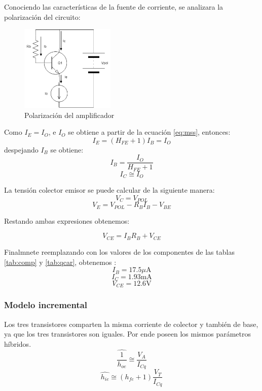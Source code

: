 \documentclass[../../main.tex]{subfiles}
\begin{document}
Conociendo las características de la fuente de corriente, se analizara la polarización del circuito:

\begin{figure}[H]	
	\centering
	\includegraphics[width=0.4\textwidth]{imagenes/pol.png}
	\caption{Polarizaci\'on del amplificador}
\end{figure}

Como $I_E=I_O $, e $ I_O $ se obtiene a partir de la ecuación \ref{eq:mss}, entonces:
\begin{equation}
I_E=\left( H_{FE} +1 \right)  I_B=I_O
\end{equation}
despejando $I_B$ se obtiene:
\begin{equation}
I_B=\frac{I_O}{H_{FE}+1}
\end{equation}
\begin{equation}
I_{C}\cong I_O
\end{equation}

La tensión colector emisor se puede calcular de la siguiente manera:
\begin{equation}
V_C=V_{POL}
\end{equation}
\begin{equation}
V_E=V_{POL} - R_B I_B - V_{BE}
\end{equation}

Restando ambas expresiones obtenemos:

\begin{equation}
V_{CE}=I_B R_B + V_{CE}
\end{equation}

Finalmnete reemplazando con los valores de los componentes de las tablas \ref{tab:comp} y \ref{tab:qcar}, obtenemos :
$$I_B=17.5\mu \mathrm{A} $$
$$I_C=1.93 \mathrm{mA} $$
$$V_{CE}=12.6\mathrm{V} $$

\subsubsection{Modelo incremental}
Los tres transistores comparten la misma corriente de colector y también de base, ya que los tres transistores son iguales. Por ende poseen los  mismos parámetros híbridos.
$$\widehat{\frac{1}{h_{oe}}}\cong \frac{V_A}{I_{Cq}} $$
$$ \widehat{h_{ie}}\cong (h_{fe}+1)\frac{V_T}{I_{Cq}}$$
\end{document}
